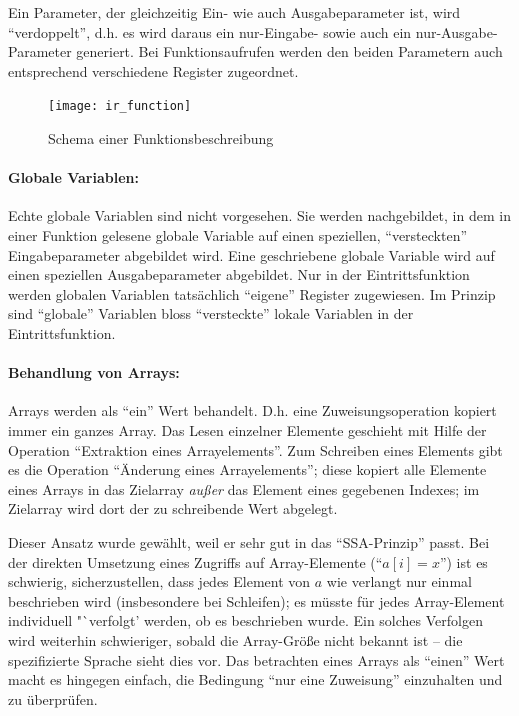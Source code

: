 \documentclass[twoside,a4paper,fleqn,12pt]{article}
\begin{document}
Ein Parameter, der gleichzeitig Ein- wie auch Ausgabeparameter ist, wird "`verdoppelt"', d.h. es wird daraus
ein nur-Eingabe- sowie auch ein nur-Ausgabe-Parameter generiert. Bei Funktionsaufrufen werden den beiden
Parametern auch entsprechend verschiedene Register zugeordnet.

\begin{figure}[h]
   \centering
  \texttt{[image: ir\_function]}
  \caption{Schema einer Funktionsbeschreibung}
  \label{fig:ir_function}
\end{figure}

\paragraph{Globale Variablen:}
Echte globale Variablen sind nicht vorgesehen. Sie werden nachgebildet, in dem in einer Funktion gelesene globale Variable
auf einen speziellen, "`versteckten"' Eingabeparameter abgebildet wird. Eine geschriebene globale Variable wird
auf einen speziellen Ausgabeparameter abgebildet. Nur in der Eintrittsfunktion werden globalen Variablen tatsächlich
"`eigene"' Register zugewiesen. Im Prinzip sind "`globale"' Variablen bloss "`versteckte"' lokale Variablen in
der Eintrittsfunktion.



\paragraph{Behandlung von Arrays:}
Arrays werden als "`ein"' Wert behandelt. D.h. eine Zuweisungsoperation kopiert immer ein ganzes Array.
Das Lesen einzelner Elemente geschieht mit Hilfe der Operation "`Extraktion eines Arrayelements"'.
Zum Schreiben eines Elements gibt es die Operation "`Änderung eines Arrayelements"'; diese kopiert alle Elemente
eines Arrays in das Zielarray \emph{außer} das Element eines gegebenen Indexes; im Zielarray wird dort der zu
schreibende Wert abgelegt.

Dieser Ansatz wurde gewählt, weil er sehr gut in das "`SSA-Prinzip"' passt.
Bei der direkten Umsetzung eines Zugriffs auf Array-Elemente ("`$a[i] = x$"') ist es schwierig, sicherzustellen, dass
jedes Element von $a$ wie verlangt nur einmal beschrieben wird (insbesondere bei Schleifen); es
müsste für jedes Array-Element individuell "`verfolgt' werden, ob es beschrieben wurde.
Ein solches Verfolgen wird weiterhin schwieriger, sobald die Array-Größe nicht bekannt ist
-- die spezifizierte Sprache sieht dies vor. Das betrachten eines Arrays als "`einen"' Wert macht es hingegen einfach,
die Bedingung "`nur eine Zuweisung"' einzuhalten und zu überprüfen.
\end{document}
